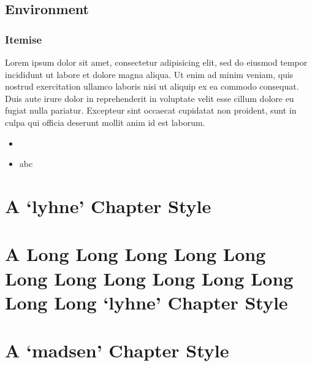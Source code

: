 \documentclass[10pt,a4paper,extrafontsizes,oldfontcommands,oneside]{memoir}
\begin{document}



\section{Environment} %
\label{sec:environment}

\subsection{Itemise} %
\label{sub:itemise}

Lorem ipsum dolor sit amet, consectetur adipisicing elit, sed do eiusmod tempor incididunt ut labore et dolore magna aliqua. Ut enim ad minim veniam, quis nostrud exercitation ullamco laboris nisi ut aliquip ex ea commodo consequat. Duis aute irure dolor in reprehenderit in voluptate velit esse cillum dolore eu fugiat nulla pariatur. Excepteur sint occaecat cupidatat non proident, sunt in culpa qui officia deserunt mollit anim id est laborum.

\begin{itemize}
	\item 
	\item abc
\end{itemize}




\chapter{A `lyhne' Chapter Style} %
\label{chap:a_lyhne_chapter_style}


\chapter{A Long Long Long Long Long Long Long Long Long Long Long Long Long `lyhne' Chapter Style} %
\label{chap:a_long_lyhne_chapter_style}


\chapter{A `madsen' Chapter Style} %
\label{chap:a_madsen_chapter_style}
\end{document}
